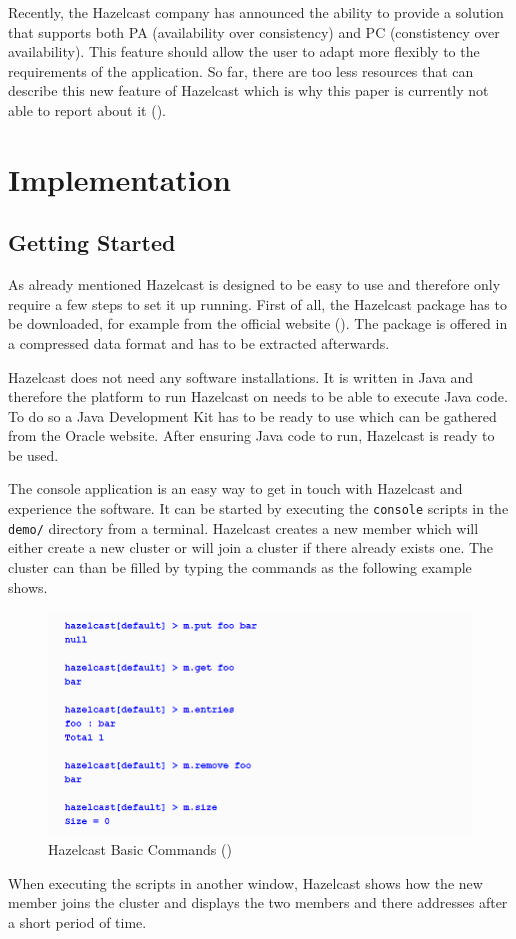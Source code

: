 Recently, the Hazelcast company has announced the ability to provide a solution that supports both PA (availability over consistency) and PC (constistency over availability). This feature should allow the user to adapt more flexibly to the requirements of the application. So far, there are too less resources that can describe this new feature of Hazelcast which is why this paper is currently not able to report about it (\cite{hazelcastCAP}).

\section{Implementation}
\subsection*{Getting Started}
As already mentioned Hazelcast is designed to be easy to use and therefore only require a few steps to set it up running.
First of all, the Hazelcast package has to be downloaded, for example from the official website (\cite{hazelcast:hazelcastDownload}). The package is offered in a compressed data format and has to be extracted afterwards.

Hazelcast does not need any software installations. It is written in Java and therefore the platform to run Hazelcast on needs to be able to execute Java code. To do so a Java Development Kit has to be ready to use which can be gathered from the Oracle website. After ensuring Java code to run, Hazelcast is ready to be used.

The console application is an easy way to get in touch with Hazelcast and experience the software. It can be started by executing the \texttt{console} scripts in the \texttt{demo/} directory from a terminal. Hazelcast creates a new member which will either create a new cluster or will join a cluster if there already exists one. The cluster can than be filled by typing the commands as the following example shows.
\begin{flushleft}
\begin{figure}[h]
    \includegraphics{content/images/hazelcastPut.PNG} 
    \caption{Hazelcast Basic Commands (\cite{johns2015})}
\end{figure}
\end{flushleft}
When executing the scripts in another window, Hazelcast shows how the new member joins the cluster and displays the two members and there addresses after a short period of time.

